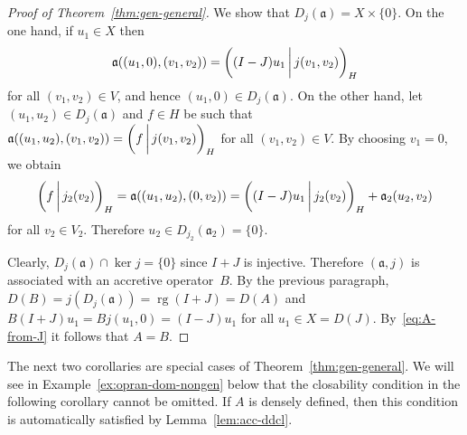 \documentclass[a4paper,oneside,12pt]{amsart}
\theoremstyle{plain}
\theoremstyle{definition}
\begin{document}
\begin{proof}[Proof of Theorem~\ref{thm:gen-general}]
We show that $D_j({{\mathfrak{{a}}}}) = X\times\{0\}$. 
On the one hand, if $u_1 \in X$ then
\[
  {{\mathfrak{{a}}}}((u_1,0),(v_1,v_2)) = {{\ifthenelse{\equal{auto}{auto}}{\left({(I-J)u_1}\mkern3mu{\biggm|}\mkern3mu {j(v_1,v_2)}\right)}{}
\ifthenelse{\equal{auto}{b}}{\bigl({(I-J)u_1}\mkern3mu{\biggm|}\mkern3mu {j(v_1,v_2)}\bigr)}{}
\ifthenelse{\equal{auto}{B}}{\Bigl({(I-J)u_1}\mkern3mu{\bigm|}\mkern3mu {j(v_1,v_2)}\Bigr)}{}
}}_H
\]
for all $(v_1,v_2) \in V$, and hence $(u_1,0) \in D_j({{\mathfrak{{a}}}})$. 
On the other hand, let $(u_1,u_2)\in D_j({{\mathfrak{{a}}}})$ and $f\in H$ be such that
${{\mathfrak{{a}}}}((u_1,u_2),(v_1,v_2))={{\ifthenelse{\equal{auto}{auto}}{\left({f}\mkern3mu{\biggm|}\mkern3mu {j(v_1,v_2)}\right)}{}
\ifthenelse{\equal{auto}{b}}{\bigl({f}\mkern3mu{\biggm|}\mkern3mu {j(v_1,v_2)}\bigr)}{}
\ifthenelse{\equal{auto}{B}}{\Bigl({f}\mkern3mu{\bigm|}\mkern3mu {j(v_1,v_2)}\Bigr)}{}
}}_H$ for all $(v_1,v_2)\in V$.
By choosing $v_1=0$, we obtain
\[
    {{\ifthenelse{\equal{auto}{auto}}{\left({f}\mkern3mu{\biggm|}\mkern3mu {j_2(v_2)}\right)}{}
\ifthenelse{\equal{auto}{b}}{\bigl({f}\mkern3mu{\biggm|}\mkern3mu {j_2(v_2)}\bigr)}{}
\ifthenelse{\equal{auto}{B}}{\Bigl({f}\mkern3mu{\bigm|}\mkern3mu {j_2(v_2)}\Bigr)}{}
}}_H = {{\mathfrak{{a}}}}((u_1,u_2),(0,v_2))={{\ifthenelse{\equal{auto}{auto}}{\left({(I-J)u_1}\mkern3mu{\biggm|}\mkern3mu {j_2(v_2)}\right)}{}
\ifthenelse{\equal{auto}{b}}{\bigl({(I-J)u_1}\mkern3mu{\biggm|}\mkern3mu {j_2(v_2)}\bigr)}{}
\ifthenelse{\equal{auto}{B}}{\Bigl({(I-J)u_1}\mkern3mu{\bigm|}\mkern3mu {j_2(v_2)}\Bigr)}{}
}}_H + {{\mathfrak{{a}}}}_2(u_2,v_2) 
\]
for all $v_2\in V_2$.
Therefore $u_2\in D_{j_2}({{\mathfrak{{a}}}}_2)=\{0\}$. 

Clearly, $D_j({{\mathfrak{{a}}}})\cap\ker j=\{0\}$ since $I+J$ is injective.
Therefore $({{\mathfrak{{a}}}},j)$ is associated with an accretive operator~$B$.
By the previous paragraph, $D(B) = j(D_j({{\mathfrak{{a}}}})) = \operatorname{rg}(I+J) = D(A)$ and
$B(I+J)u_1 = Bj(u_1,0) = (I-J)u_1$ for all $u_1 \in X = D(J)$. 
By~\eqref{eq:A-from-J} it follows that $A=B$.
\end{proof}

The next two corollaries are special cases of Theorem~\ref{thm:gen-general}.
We will see in Example~\ref{ex:opran-dom-nongen} below that the closability condition
in the following corollary cannot be omitted. If $A$ is densely
defined, then this condition is automatically satisfied by
Lemma~\ref{lem:acc-ddcl}.
\end{document}
